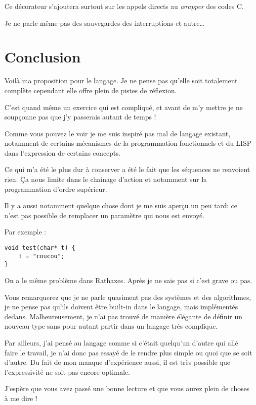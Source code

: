 \documentclass[french]{rtxreport}
\begin{document}
Ce décorateur s’ajoutera surtout sur les appels directs au \emph{wrapper} des codes C.

Je ne parle même pas des sauvegardes des interruptions et autre\ldots


\chapter{Conclusion}
Voilà ma proposition pour le langage. Je ne pense pas qu’elle soit totalement complète cependant elle offre plein de pistes de réflexion.

C’est quand même un exercice qui est compliqué, et avant de m’y mettre je ne soupçonne pas que j’y passerais autant de temps !

Comme vous pouvez le voir je me suis inspiré pas mal de langage existant, notamment de certains mécanismes de la programmation fonctionnels et du LISP dans l’expression de certains concepts.

Ce qui m’a été le plus dur à conserver a été le fait que les séquences ne renvoient rien. Ça nous limite dans le chainage d’action et notamment sur la programmation d’ordre supérieur.

Il y a aussi notamment quelque chose dont je me suis aperçu un peu tard: ce n’est pas possible de remplacer un paramètre qui nous est envoyé.

Par exemple :
\lstset{language=C}
\begin{lstlisting}
void test(char* t) {
	t = "coucou";
}
\end{lstlisting}


On a le même problème dans Rathaxes. Après je ne sais pas si c’est grave ou pas.

Vous remarquerez que je ne parle quasiment pas des systèmes et des algorithmes, je ne pense pas qu’ils doivent être built-in dans le langage, mais implémentés dedans. Malheureusement, je n’ai pas trouvé de manière élégante de définir un nouveau type sans pour autant partir dans un langage très complique.

Par ailleurs, j’ai pensé au langage comme si c’était quelqu’un d’autre qui allé faire le travail, je n’ai donc pas essayé de le rendre plus simple ou quoi que se soit d’autre. Du fait de mon manque d’expérience aussi, il est très possible que l’expressivité ne soit pas encore optimale.

J’espère que vous avez passé une bonne lecture et que vous aurez plein de choses à me dire !
\end{document}
